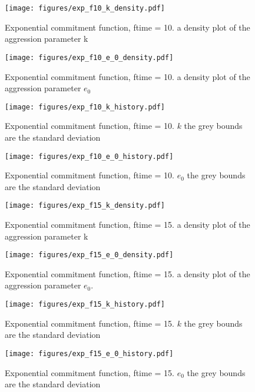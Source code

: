 \documentclass[a4paper,11pt]{article}
\begin{document}

\begin{figure}[h!]
    \centering
    \texttt{[image: figures/exp\_f10\_k\_density.pdf]}
    \caption{Exponential commitment function, ftime = 10. a density plot of the aggression parameter k}
    \label{fig:k density}

    \texttt{[image: figures/exp\_f10\_e\_0\_density.pdf]}
    \caption{Exponential commitment function, ftime = 10. a density plot of the aggression parameter $e_0$}
    \label{fig:e_0 density}
\end{figure}

\begin{figure}[h!]
    \centering
    \texttt{[image: figures/exp\_f10\_k\_history.pdf]}
    \caption{Exponential commitment function, ftime = 10. $k$ the grey bounds are the standard deviation}
    \label{fig:k history}

    \texttt{[image: figures/exp\_f10\_e\_0\_history.pdf]}
    \caption{ Exponential commitment function, ftime = 10. $e_0$ the grey bounds are the standard deviation}
    \label{fig:e_0 history}
\end{figure}

\begin{figure}[h!]
    \centering
    \texttt{[image: figures/exp\_f15\_k\_density.pdf]}
    \caption{Exponential commitment function, ftime = 15. a density plot of the aggression parameter k}
    \label{fig:k density}

    \texttt{[image: figures/exp\_f15\_e\_0\_density.pdf]}
    \caption{Exponential commitment function, ftime = 15. a density plot of the aggression parameter $e_0$.}
    \label{fig:e_0 density}
\end{figure}

\begin{figure}[h!]
    \centering
    \texttt{[image: figures/exp\_f15\_k\_history.pdf]}
    \caption{Exponential commitment function, ftime = 15. $k$ the grey bounds are the standard deviation}

    \texttt{[image: figures/exp\_f15\_e\_0\_history.pdf]}
    \caption{Exponential commitment function, ftime = 15. $e_0$ the grey bounds are the standard deviation}
\end{figure}
\end{document}
